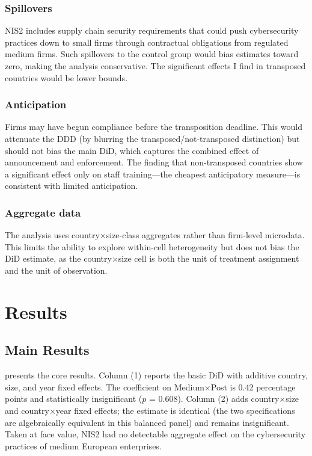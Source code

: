 \documentclass[12pt]{article}
\begin{document}
\subsubsection*{Spillovers} NIS2 includes supply chain security requirements that could push cybersecurity practices down to small firms through contractual obligations from regulated medium firms. Such spillovers to the control group would bias estimates toward zero, making the analysis conservative. The significant effects I find in transposed countries would be lower bounds.

\subsubsection*{Anticipation} Firms may have begun compliance before the transposition deadline. This would attenuate the DDD (by blurring the transposed/not-transposed distinction) but should not bias the main DiD, which captures the combined effect of announcement and enforcement. The finding that non-transposed countries show a significant effect only on staff training---the cheapest anticipatory measure---is consistent with limited anticipation.

\subsubsection*{Aggregate data} The analysis uses country$\times$size-class aggregates rather than firm-level microdata. This limits the ability to explore within-cell heterogeneity but does not bias the DiD estimate, as the country$\times$size cell is both the unit of treatment assignment and the unit of observation.

\section{Results}

\subsection{Main Results}



 presents the core results. Column (1) reports the basic DiD with additive country, size, and year fixed effects. The coefficient on Medium$\times$Post is 0.42 percentage points and statistically insignificant ($p$ = 0.608). Column (2) adds country$\times$size and country$\times$year fixed effects; the estimate is identical (the two specifications are algebraically equivalent in this balanced panel) and remains insignificant. Taken at face value, NIS2 had no detectable aggregate effect on the cybersecurity practices of medium European enterprises.
\end{document}
